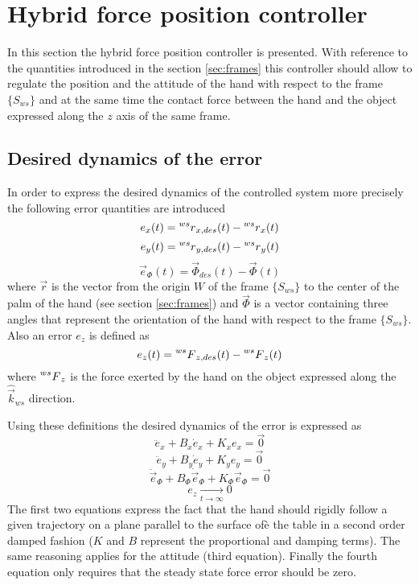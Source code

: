 \section{Hybrid force position controller}
In this section the hybrid force position controller is presented.
With reference to the quantities introduced in the section \ref{sec:frames}
this controller should allow to regulate the position and the attitude of the hand
with respect to the frame $\{S_{ws}\}$ and at the same time the contact force between
the hand and the object expressed along the $z$ axis of the same frame.

\subsection{Desired dynamics of the error}\label{sec:desired_dyn}
In order to express the desired dynamics of the controlled system
more precisely the following error quantities are introduced
\[
e_x(t) =   \prescript{ws}{} r_{x,des}(t) - \prescript{ws}{} r_{x}(t)
\]
\[
e_y(t) =   \prescript{ws}{} r_{y,des}(t) - \prescript{ws}{} r_{y}(t)
\]
\[
\vec{e}_{\Phi}(t) = \vec{\Phi}_{des}(t) - \vec{\Phi}(t)
\]
where $\vec{r}$ is the vector from the origin $W$ of the frame $\{S_{ws}\}$ to the
center of the palm of the hand (see section \ref{sec:frames}) and $\vec{\Phi}$ is
a vector containing three angles that represent the orientation of the hand with respect
to the frame $\{S_{ws}\}$.
Also an error $e_z$ is defined as
\[
e_{z}(t) = \prescript{ws}{} F_{z,des}(t) - \prescript{ws}{} F_{z}(t)
\]
where $\prescript{ws}{} F_{z}$ is the force exerted by the hand on the object expressed
along the $\hat{\vec{k}}_{ws}$ direction.
\par
Using these definitions the desired dynamics of the error is expressed as
\[
\ddot{e}_{x} + B_x \dot{e}_x + K_x e_x = \vec{0} %
\]
\[
\ddot{e}_{y} + B_y \dot{e}_y + K_y e_y = \vec{0} %
\]
\[
\ddot{\vec{e}}_{\Phi} + B_{\Phi} \dot{\vec{e}}_{\Phi} + K_{\Phi} \vec{e}_{\Phi} = \vec{0} %
\]
\[
e_z \xrightarrow[t \to \infty]{} 0
\]
The first two equations express the fact that the hand should rigidly follow
a given trajectory on a plane parallel to the surface ofè the table in a second order damped
fashion ($K$ and $B$ represent the proportional and damping terms).
The same reasoning applies for the attitude (third equation).
Finally the fourth equation only requires that the steady state force error should be zero.

